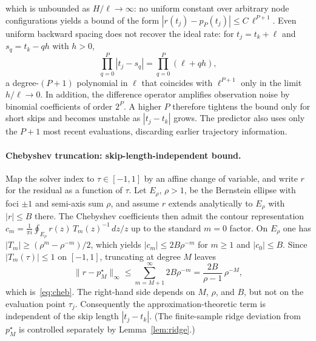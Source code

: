 which is unbounded as $H/\ell \to \infty$: no uniform constant over
arbitrary node configurations yields a bound of the form
$|r(t_j) - p_P(t_j)| \le C\,\ell^{P+1}$. Even uniform backward spacing
does not recover the ideal rate: for $t_j = t_k + \ell$ and
$s_q = t_k - qh$ with $h > 0$,
\begin{equation}
  \prod_{q=0}^{P}|t_j - s_q| = \prod_{q=0}^{P}(\ell + qh),
  \label{eq:app-uniform-product}
\end{equation}
a degree-$(P{+}1)$ polynomial in $\ell$ that coincides with
$\ell^{P+1}$ only in the limit $h/\ell \to 0$. In addition, the difference
operator amplifies observation noise by binomial coefficients of order
$2^P$. A higher $P$ therefore tightens the bound only for short skips
and becomes unstable as $|t_j-t_k|$ grows. The predictor also uses only
the $P{+}1$ most recent evaluations, discarding earlier trajectory
information.

\paragraph{Chebyshev truncation: skip-length-independent bound.}
\label{app:cheb}
Map the solver index to $\tau \in [-1,1]$ by an affine change of
variable, and write $r$ for the residual as a function of $\tau$. Let
$E_\rho$, $\rho > 1$, be the Bernstein ellipse with foci $\pm 1$ and
semi-axis sum $\rho$, and assume $r$ extends analytically to $E_\rho$
with $|r| \le B$ there. The Chebyshev coefficients then admit the
contour representation
$c_m = \frac{1}{\pi i}\oint_{E_\rho} r(z)\,T_m(z)^{-1}\,dz/z$ up to the
standard $m=0$ factor. On $E_\rho$ one has
$|T_m| \ge (\rho^m - \rho^{-m})/2$, which yields $|c_m| \le 2B\rho^{-m}$
for $m \ge 1$ and $|c_0| \le B$. Since $|T_m(\tau)| \le 1$ on $[-1,1]$,
truncating at degree $M$ leaves
\begin{equation}
  \|r - p_M^\star\|_\infty \le \sum_{m=M+1}^{\infty} 2B\rho^{-m}
  = \frac{2B}{\rho - 1}\,\rho^{-M},
\end{equation}
which is~\eqref{eq:cheb}. The right-hand side depends on $M$, $\rho$,
and $B$, but not on the evaluation point $\tau_j$. Consequently the
approximation-theoretic term is independent of the skip length
$|t_j-t_k|$. (The finite-sample ridge deviation from $p_M^\star$ is
controlled separately by Lemma~\ref{lem:ridge}.)

